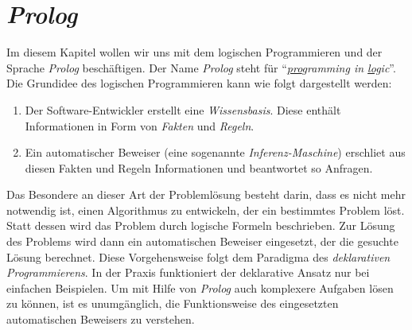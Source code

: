 \chapter{\textsl{Prolog}} 
Im diesem Kapitel wollen wir uns mit dem logischen Programmieren und der
Sprache \textsl{Prolog} besch\"{a}ftigen.  Der Name \textsl{Prolog} steht f\"{u}r 
``\emph{\underline{pro}gramming in \underline{log}ic}''.
Die Grundidee des logischen Programmieren 
kann wie folgt dargestellt werden:
\begin{enumerate}
\item Der Software-Entwickler erstellt eine \emph{Wissensbasis}.
      Diese enth\"{a}lt Informationen in Form von \emph{Fakten} und \emph{Regeln}.
\item Ein automatischer Beweiser (eine sogenannte \emph{Inferenz-Maschine})
      erschlie\3t aus diesen Fakten und Regeln
      Informationen und beantwortet so Anfragen.
\end{enumerate}
Das Besondere an dieser Art der Probleml\"{o}sung besteht darin, dass es nicht mehr notwendig
ist, einen Algorithmus zu entwickeln, der ein bestimmtes Problem l\"{o}st.  Statt dessen
wird das Problem durch logische Formeln beschrieben.  Zur L\"{o}sung des Problems
wird dann ein automatischen Beweiser eingesetzt, der die gesuchte L\"{o}sung berechnet.
Diese Vorgehensweise folgt dem Paradigma des \emph{deklarativen Programmierens}.
In der Praxis funktioniert der deklarative Ansatz nur bei einfachen Beispielen.  Um mit
Hilfe von \textsl{Prolog} auch komplexere Aufgaben l\"{o}sen zu k\"{o}nnen, ist es unumg\"{a}nglich, die
Funktionsweise des eingesetzten automatischen Beweisers zu verstehen.

